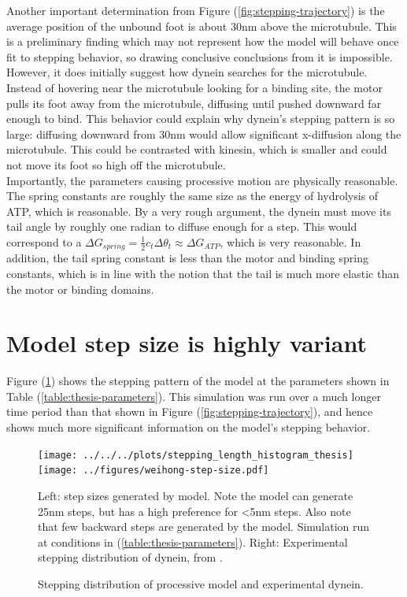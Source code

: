 \documentclass[
11pt, %
english, %
singlespacing, %
headsepline, %
chapterinoneline, %
]{MastersDoctoralThesis} %
\begin{document}
Another important determination from Figure (\ref{fig:stepping-trajectory}) is the average position of the unbound foot is about 30nm above the microtubule. This is a preliminary finding which may not represent how the model will behave once fit to stepping behavior, so drawing conclusive conclusions from it is impossible. However, it does initially suggest how dynein searches for the microtubule. Instead of hovering near the microtubule looking for a binding site, the motor pulls its foot away from the microtubule, diffusing until pushed downward far enough to bind. This behavior could explain why dynein's stepping pattern is so large: diffusing downward from 30nm would allow significant x-diffusion along the microtubule. This could be contrasted with kinesin, which is smaller and could not move its foot so high off the microtubule.\\

Importantly, the parameters causing processive motion are physically reasonable. The spring constants are roughly the same size as the energy of hydrolysis of ATP, which is reasonable. By a very rough argument, the dynein must move its tail angle by roughly one radian to diffuse enough for a step. This would correspond to a $\Delta G_{spring} = \frac{1}{2}c_t\Delta \theta_t \approx \Delta G_{ATP}$, which is very reasonable. In addition, the tail spring constant is less than the motor and binding spring constants, which is in line with the notion that the tail is much more elastic than the motor or binding domains.\\

\section{Model step size is highly variant}
Figure (\ref{fig:final-histograms}) shows the stepping pattern of the model at the parameters shown in Table (\ref{table:thesis-parameters}). This simulation was run over a much longer time period than that shown in Figure (\ref{fig:stepping-trajectory}), and hence shows much more significant information on the model's stepping behavior.\\

\begin{figure}[H]
  \centering
    \texttt{[image: ../../../plots/stepping\_length\_histogram\_thesis]}%
    \texttt{[image: ../figures/weihong-step-size.pdf]}
    \caption{Stepping distribution of processive model and experimental dynein.}{Left: step sizes generated by model. Note the model can generate 25nm steps, but has a high preference for <5nm steps. Also note that few backward steps are generated by the model. Simulation run at conditions in (\ref{table:thesis-parameters}). Right: Experimental stepping distribution of dynein, from \cite{weihongpaper}.}
    \label{fig:final-histograms}
\end{figure}
\end{document}
